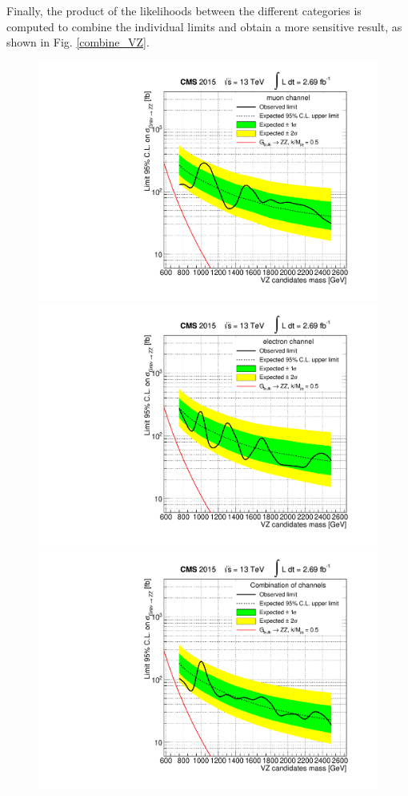 Finally, the product of the likelihoods between the different categories is computed to combine the individual limits and obtain a more sensitive result, as shown in Fig. \ref{combine_VZ}.
\begin{figure}[h]
\centering
\includegraphics[scale=0.37]{figures/limits/limitMNP.pdf}
\includegraphics[scale=0.37]{figures/limits/limitENP.pdf}\\
\includegraphics[scale=0.65]{figures/limits/limitANP.pdf}

\end{figure}
